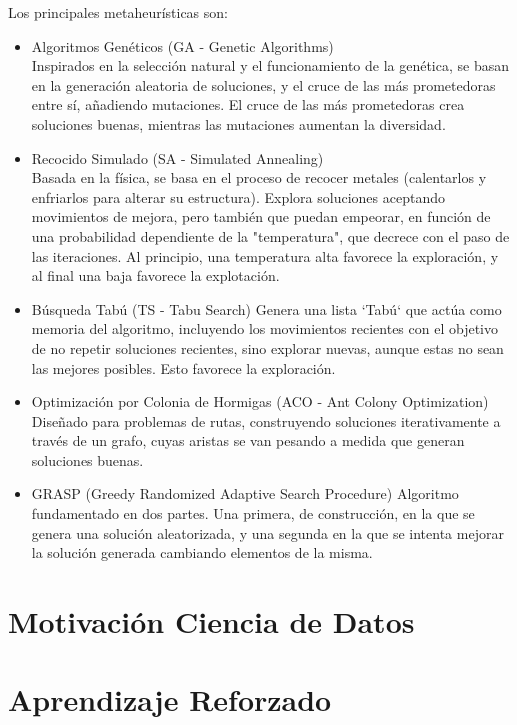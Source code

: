 \documentclass[12pt,a4paper]{book}
\begin{document}
Los principales metaheurísticas son:
\begin{itemize}
    \item Algoritmos Genéticos (GA - Genetic Algorithms)\\
    Inspirados en la selección natural y el funcionamiento de la genética, se basan en la generación aleatoria de soluciones, y el cruce de las más prometedoras entre sí, 
    añadiendo mutaciones. El cruce de las más prometedoras crea soluciones buenas, mientras las mutaciones aumentan la diversidad.
    \item Recocido Simulado (SA - Simulated Annealing)\\
    Basada en la física, se basa en el proceso de recocer metales (calentarlos y enfriarlos para alterar su estructura). Explora soluciones aceptando movimientos de mejora, pero también que puedan empeorar, 
    en función de una probabilidad dependiente de la "temperatura", que decrece con el paso de las iteraciones. Al principio, una temperatura alta favorece la exploración, y al final una baja favorece la explotación.
    \item Búsqueda Tabú (TS - Tabu Search)
    Genera una lista `Tabú` que actúa como memoria del algoritmo, incluyendo los movimientos recientes con el objetivo de no repetir soluciones recientes, sino explorar nuevas, aunque estas no sean las mejores posibles. Esto favorece la exploración.
    \item Optimización por Colonia de Hormigas (ACO - Ant Colony Optimization)
    Diseñado para problemas de rutas, construyendo soluciones iterativamente a través de un grafo, cuyas aristas  se van pesando a medida que generan soluciones buenas.
    \item GRASP (Greedy Randomized Adaptive Search Procedure)
    Algoritmo fundamentado en dos partes. Una primera, de construcción, en la que se genera una solución aleatorizada, y una segunda en la que se intenta mejorar la solución generada cambiando elementos de la misma.
\end{itemize}

\section{Motivación Ciencia de Datos}

\section{Aprendizaje Reforzado}
\end{document}
